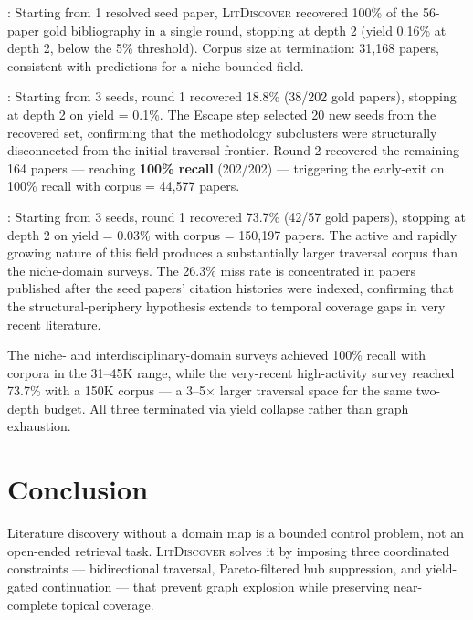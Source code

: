 \documentclass[conference]{IEEEtran}
\newcommand{\ldiscover}{\textsc{LitDiscover}}
\begin{document}
\textbf{\citet{Bobrowski2018}}: Starting from 1 resolved seed paper, \ldiscover{}
recovered 100\% of the 56-paper gold bibliography in a single round, stopping at depth 2
(yield 0.16\% at depth 2, below the 5\% threshold). Corpus size at termination: 31,168
papers, consistent with predictions for a niche bounded field.

\textbf{\citet{Galesic2021}}: Starting from 3 seeds, round 1 recovered 18.8\%
(38/202 gold papers), stopping at depth 2 on yield = 0.1\%. The Escape step selected 20
new seeds from the recovered set, confirming that the methodology subclusters were
structurally disconnected from the initial traversal frontier. Round 2 recovered the
remaining 164 papers --- reaching \textbf{100\% recall} (202/202) --- triggering the
early-exit on 100\% recall with corpus = 44,577 papers.

\textbf{\citet{Liu2025}}: Starting from 3 seeds, round 1 recovered 73.7\% (42/57 gold
papers), stopping at depth 2 on yield = 0.03\% with corpus = 150,197 papers. The active
and rapidly growing nature of this field produces a substantially larger traversal corpus
than the niche-domain surveys. The 26.3\% miss rate is concentrated in papers published
after the seed papers' citation histories were indexed, confirming that the
structural-periphery hypothesis extends to temporal coverage gaps in very recent
literature.

The niche- and interdisciplinary-domain surveys achieved 100\% recall with corpora in the
31--45K range, while the very-recent high-activity survey reached 73.7\% with a 150K corpus
--- a 3--5$\times$ larger traversal space for the same two-depth budget. All three terminated
via yield collapse rather than graph exhaustion.

\section{Conclusion}

Literature discovery without a domain map is a bounded control problem, not an open-ended
retrieval task. \ldiscover{} solves it by imposing three coordinated constraints
--- bidirectional traversal, Pareto-filtered hub suppression, and yield-gated continuation
--- that prevent graph explosion while preserving near-complete topical coverage.
\end{document}
